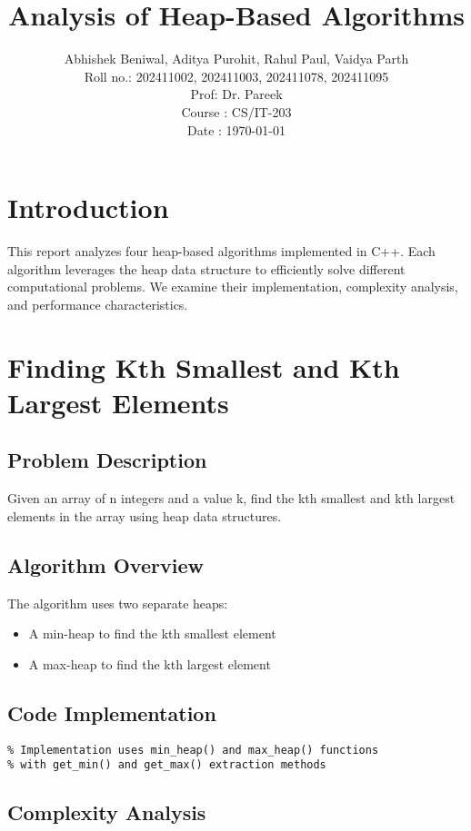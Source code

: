 \documentclass[12pt]{article}
\title{Analysis of Heap-Based Algorithms}\\
\author{Abhishek Beniwal, Aditya Purohit, Rahul Paul, Vaidya Parth \\
\small{Roll no.: 202411002, 202411003, 202411078, 202411095} \\
\small{Prof: Dr. Pareek} \\
\small{Course : CS/IT-203} \\
\small{Date : \today}}\\
\date{}
\begin{document}
\maketitle

\tableofcontents
\newpage

\section{Introduction}
This report analyzes four heap-based algorithms implemented in C++. Each algorithm leverages the heap data structure to efficiently solve different computational problems. We examine their implementation, complexity analysis, and performance characteristics.

\section{Finding Kth Smallest and Kth Largest Elements}
\subsection{Problem Description}
Given an array of n integers and a value k, find the kth smallest and kth largest elements in the array using heap data structures.

\subsection{Algorithm Overview}
The algorithm uses two separate heaps:
\begin{itemize}
    \item A min-heap to find the kth smallest element
    \item A max-heap to find the kth largest element
\end{itemize}

\subsection{Code Implementation}
\begin{lstlisting}[caption={Kth Smallest and Largest Elements - lab3q4.cpp}]
% CODE TO BE INSERTED HERE
% Implementation uses min_heap() and max_heap() functions
% with get_min() and get_max() extraction methods
\end{lstlisting}

\subsection{Complexity Analysis}
\end{document}
